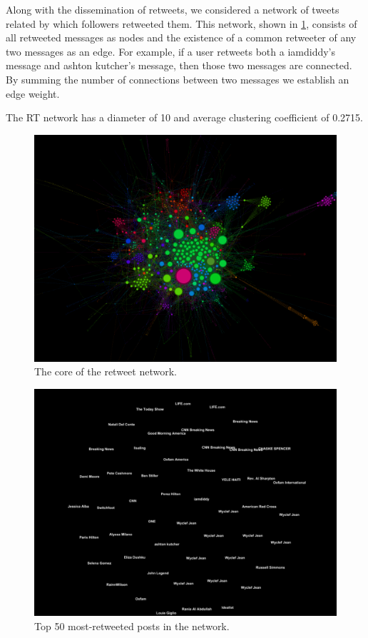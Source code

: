 \documentclass[a4paper, 11pt, titlepage]{article}
\begin{document}
Along with the dissemination of retweets, we considered a network of tweets related by which followers retweeted them.  This network, shown in \ref{fig:rt_net_core}, consists of all retweeted messages as nodes and the existence of a common retweeter of any two messages as an edge.  For example, if a user retweets both a iamdiddy's message and ashton kutcher's message, then those two messages are connected.  By summing the number of connections between two messages we establish an edge weight.

The RT network has a diameter of 10 and average clustering coefficient of 0.2715.

\begin{figure}[h]
\centering
\label{fig:rt_net_core}
\includegraphics[width=120mm]{../figures/rt_net_core}
\caption{The core of the retweet network.}
\end{figure}

\begin{figure}[h]
\centering
\label{fig:rt_net_top_50}
\includegraphics[width=120mm]{../figures/rt_net_top_50_tweets}
\caption{Top 50 most-retweeted posts in the network.}
\end{figure}
\end{document}
